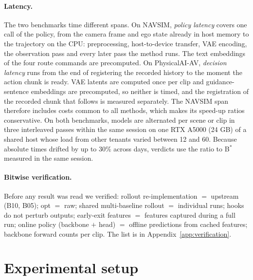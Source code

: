 \documentclass[10pt]{article}
\newcommand{\Bstar}{B$^{*}$}
\begin{document}
\paragraph{Latency.} The two benchmarks time different spans. On NAVSIM, \emph{policy latency} covers one call of the policy, from the camera frame and ego state already in host memory to the trajectory on the CPU: preprocessing, host-to-device transfer, VAE encoding, the observation pass and every later pass the method runs. The text embeddings of the four route commands are precomputed. On PhysicalAI-AV, \emph{decision latency} runs from the end of registering the recorded history to the moment the action chunk is ready. VAE latents are computed once per clip and guidance-sentence embeddings are precomputed, so neither is timed, and the registration of the recorded chunk that follows is measured separately. The NAVSIM span therefore includes costs common to all methods, which makes its speed-up ratios conservative. On both benchmarks, models are alternated per scene or clip in three interleaved passes within the same session on one RTX A5000 (24 GB) of a shared host whose load from other tenants varied between 12 and 60. Because absolute times drifted by up to 30\% across days, verdicts use the ratio to \Bstar{} measured in the same session.

\paragraph{Bitwise verification.} Before any result was read we verified: rollout re-implementation $=$ upstream (B10, B05); opt $=$ raw; shared multi-baseline rollout $=$ individual runs; hooks do not perturb outputs; early-exit features $=$ features captured during a full run; online policy (backbone $+$ head) $=$ offline predictions from cached features; backbone forward counts per clip. The list is in Appendix~\ref{app:verification}.

\section{Experimental setup}
\label{sec:setup}
\end{document}
